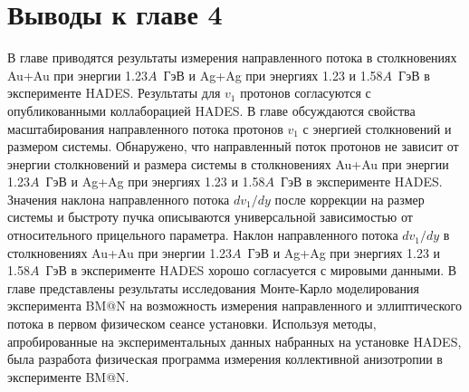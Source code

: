 \section{Выводы к главе 4}
В главе приводятся результаты измерения направленного потока в столкновениях Au+Au при энергии 1.23$A$~ГэВ и Ag+Ag при энергиях 1.23 и 1.58$A$~ГэВ в эксперименте HADES.
Результаты для $v_1$ протонов согласуются с опубликованными коллаборацией HADES.
В главе обсуждаются свойства масштабирования направленного потока протонов $v_1$ с энергией столкновений и размером системы.
Обнаружено, что направленный поток протонов не зависит от энергии столкновений и размера системы в столкновениях Au+Au при энергии 1.23$A$~ГэВ и Ag+Ag при энергиях 1.23 и 1.58$A$~ГэВ в эксперименте HADES.
Значения наклона направленного потока $dv_1/dy$ после коррекции на размер системы и быстроту пучка описываются универсальной зависимостью от относительного прицельного параметра.
Наклон направленного потока $dv_1/dy$ в столкновениях Au+Au при энергии 1.23$A$~ГэВ и Ag+Ag при энергиях 1.23 и 1.58$A$~ГэВ в эксперименте HADES хорошо согласуется с мировыми данными.
В главе представлены результаты исследования Монте-Карло моделирования эксперимента BM@N на возможность измерения направленного и эллиптического потока в первом физическом сеансе установки.
Используя методы, апробированные на экспериментальных данных набранных на установке HADES, была разработа физическая программа измерения коллективной анизотропии в эксперименте BM@N.